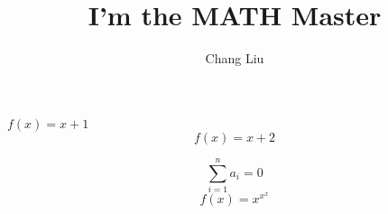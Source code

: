 \documentclass[7pt]{article}
\author{Chang Liu}
\title{I'm the MATH Master}
\begin{document}
\maketitle

$f(x) = x + 1$ %
$$f(x) = x + 2 $$

$$\sum_{i=1}^n a_i=0$$
$$f(x)=x^{x^x}$$
\end{document}
